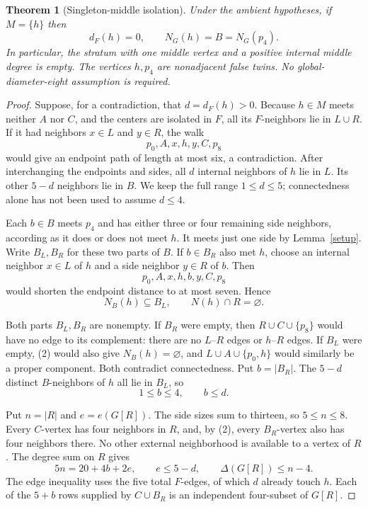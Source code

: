 \documentclass[11pt]{article}
\newtheorem{theorem}{Theorem}
\begin{document}
\begin{theorem}[Singleton-middle isolation]\label{main}
Under the ambient hypotheses, if $M=\{h\}$ then
\[
 d_F(h)=0,\qquad N_G(h)=B=N_G(p_4).
\]
In particular, the stratum with one middle vertex and a positive
internal middle degree is empty. The vertices $h,p_4$ are nonadjacent
false twins. No global-diameter-eight assumption is required.
\end{theorem}
\begin{proof}
Suppose, for a contradiction, that $d=d_F(h)>0$.
Because $h\in M$ meets neither $A$ nor $C$, and the centers are
isolated in $F$, all its $F$-neighbors lie in $L\cup R$.
If it had neighbors $x\in L$ and $y\in R$, the walk
\[
 p_0,A,x,h,y,C,p_8
\]
would give an endpoint path of length at most six, a contradiction.
After interchanging the endpoints and sides, all $d$ internal
neighbors of $h$ lie in $L$. Its other $5-d$ neighbors lie in $B$.
We keep the full range $1\leq d\leq5$; connectedness alone has
not been used to assume $d\leq4$.

Each $b\in B$ meets $p_4$ and has either three or four remaining
side neighbors, according as it does or does not meet $h$.
It meets just one side by Lemma~\ref{setup}. Write $B_L,B_R$
for these two parts of $B$. If $b\in B_R$ also met $h$, choose
an internal neighbor $x\in L$ of $h$ and a side neighbor $y\in R$
of $b$. Then
\[
 p_0,A,x,h,b,y,C,p_8
\]
would shorten the endpoint distance to at most seven. Hence
\[
 N_B(h)\subseteq B_L,\qquad N(h)\cap R=\varnothing.  \tag{2}
\]

Both parts $B_L,B_R$ are nonempty. If $B_R$ were empty, then
$R\cup C\cup\{p_8\}$ would have no edge to its complement:
there are no $L$--$R$ edges or $h$--$R$ edges. If $B_L$ were
empty, (2) would also give $N_B(h)=\varnothing$, and
$L\cup A\cup\{p_0,h\}$ would similarly be a proper component.
Both contradict connectedness. Put $b=|B_R|$. The $5-d$ distinct
$B$-neighbors of $h$ all lie in $B_L$, so
\[
 1\leq b\leq4,\qquad b\leq d.                     \tag{3}
\]

Put $n=|R|$ and $e=e(G[R])$. The side sizes sum to thirteen,
so $5\leq n\leq8$. Every $C$-vertex has four neighbors in $R$,
and, by (2), every $B_R$-vertex also has four neighbors there.
No other external neighborhood is available to a vertex of $R$.
The degree sum on $R$ gives
\[
 5n=20+4b+2e,
 \qquad e\leq5-d,\qquad\Delta(G[R])\leq n-4.       \tag{4}
\]
The edge inequality uses the five total $F$-edges, of which $d$
already touch $h$. Each of the $5+b$ rows supplied by $C\cup B_R$
is an independent four-subset of $G[R]$.


\end{proof}
\end{document}

